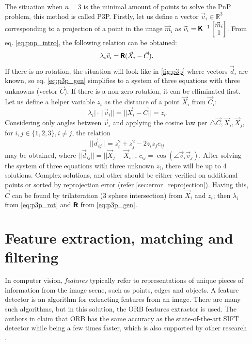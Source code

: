 The situation when $n=3$ is the minimal amount of points to solve the PnP problem, this method is called P3P.  
Firstly, let us define a vector $\vec{v}_i \in \mathbb{R}^3$ corresponding to a projection of a point in the image $\vec{m}_i$ as $\vec{v}_i = \pmb{\mathsf{K}}^{-1}\begin{bmatrix}\vec{m}_i \\ 1 \end{bmatrix}$. From eq. \eqref{eq:pnp_intro}, the following relation can be obtained:
\begin{equation}
    \label{eq:p3p_gen}
    \lambda_i \vec{v}_i = \pmb{\mathsf{R}} (\vec{X}_i - \vec{C}).
\end{equation}
If there is no rotation, the situation will look like in \autoref{fig:p3p} where vectors $\vec{d}_i$ are known, so eq. \eqref{eq:p3p_gen} simplifies to a system of three equations with three unknowns (vector $\vec{C}$).
If there is a non-zero rotation, it can be elliminated first.
Let us define a helper variable $z_i$ as the distance of a point $\vec{X}_i$ from $\vec{C}_i$:
\begin{equation}
    \label{eq:p3p_rot}
    |\lambda_i| \cdot ||\vec{v}_i|| = || \vec{X}_i - \vec{C} || = z_i.
\end{equation}
Considering only angles between $\vec{v}_i$ and applying the cosine law per $\triangle{\vec{C}, \vec{X}_i, \vec{X}_j}$, for $i, j \in \{1, 2, 3\}, i \neq j$, the relation
\begin{equation}
    ||\vec{d}_{ij}|| = z_i^2 + z_j^2 - 2z_iz_jc_{ij}
\end{equation}
may be obtained, where $||\vec{d}_{ij}|| = || \vec{X}_j - \vec{X}_i ||$, $c_{ij} = \cos(\angle \vec{v}_i \vec{v}_j)$.
After solving the system of three equations with three unknown $z_i$, there will be up to 4 solutions.
Complex solutions, and other should be either verified on additional points \cite{Fischler1981} or sorted by reprojection error (refer \autoref{sec:error_reprojection}).
Having this, $\vec{C}$ can be found by trilateration (3 sphere intersection) from $\vec{X}_i$ and $z_i$; then $\lambda_i$ from \eqref{eq:p3p_rot} and $\pmb{\mathsf{R}}$ from \eqref{eq:p3p_gen}.

\section{Feature extraction, matching and filtering}
\label{sec:features}
In computer vision, \textit{features} typically refer to representations of unique pieces of information from the image scene, such as points, edges and objects.
A feature detector is an algorithm for extracting features from an image.
There are many such algorithms, but in this solution, the ORB features extractor is used. 
The authors in \cite{Rublee2011} claim that ORB has the same accuracy as the state-of-the-art SIFT detector while being a few times faster, which is also supported by other research \cite{Sharif2017}. 

